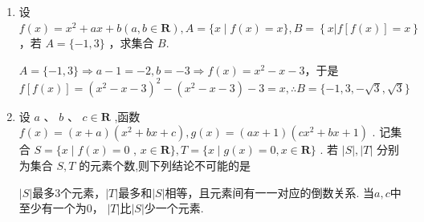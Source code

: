 \begin{enumerate}
    \item 设 $f\left( x\right)  = {x}^{2} + {ax} + b\left( {a,b \in  \mathbf{R}}\right) ,A = \{ x \mid  f\left( x\right)  = x\} ,B = \left\{  {x\left| {f\left\lbrack  {f\left( x\right) }\right\rbrack   = x}\right. }\right\}$，若 $A = \{  - 1,3\}$ ，求集合 $B$.
    \begin{jieda}
        $A = \{  - 1,3\}  \Longrightarrow  a - 1 =  - 2,b =  - 3 \Longrightarrow  f\left( x\right)  = {x}^{2} - x - 3$，于是 $f\left\lbrack  {f\left( x\right) }\right\rbrack   = {\left( {x}^{2} - x - 3\right) }^{2} - \left( {{x}^{2} - x - 3}\right)  - 3 = x,\therefore B = \{  - 1,3, - \sqrt{3},\sqrt{3}\}$
    \end{jieda}
    
    \item 设 $a$ 、 $b$ 、 $c \in  \mathbf{R}$ ,函数 $f\left( x\right)  = \left( {x + a}\right) \left( {{x}^{2} + {bx} + c}\right) ,g\left( x\right)  = \left( {{ax} + 1}\right) \left( {c{x}^{2} + {bx} + 1}\right)$ . 记集合 $S = \{ x \mid  f\left( x\right)  = 0$ , $x \in  \mathbf{R}\} ,T = \{ x \mid  g\left( x\right)  = 0,x \in  \mathbf{R}\}$ . 若 $\left| S\right| ,\left| T\right|$ 分别为集合 $S,T$ 的元素个数,则下列结论不可能的是
    \begin{jieda}
        $|S|$最多3个元素，$|T|$最多和$|S|$相等，且元素间有一一对应的倒数关系. 当$a,c$中至少有一个为0， $|T|$比$|S|$少一个元素.
    \end{jieda}

\end{enumerate}
\clearpage
